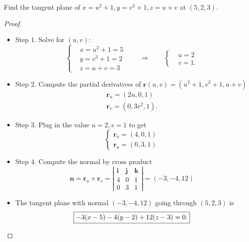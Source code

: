 \begin{example} Find the tangent plane of $x = u^2+1, y=v^3+1, z = u+v$ at $(5,2,3)$.
\end{example}
\begin{proof} \quad 
\begin{itemize}
    \item Step 1. Solve for $(u,v)$: 
    \begin{equation*}
        \begin{cases}
            & x = u^2+1 = 5\\
            & y = v^3+1 = 2\\
            & z = u + v = 3
        \end{cases} \qquad\Longrightarrow\qquad \begin{cases}
            & u = 2 \\
            & v =  1.
        \end{cases} 
    \end{equation*}
    \item Step 2. Compute the partial derivatives of $\textbf{r}(u,v) = (u^2+1, v^3+1, u+v)$
    \begin{align*}
        \textbf{r}_u = (2u, 0, 1)\\
        \textbf{r}_v = (0, 3v^2, 1).
    \end{align*}
    \item Step 3. Plug in the value $u=2,  v=1$ to get 
    \begin{equation*}
        \begin{cases}
            \textbf{r}_u = (4, 0, 1)\\
            \textbf{r}_u = (0, 3, 1)
        \end{cases} 
    \end{equation*}
    \item Step 4. Compute the normal by cross product
    \begin{equation*}
        \textbf{n} = \textbf{r}_u \times \textbf{r}_v = 
        \left|
    \begin{array}{ccc}
         \textbf{i}& \textbf{j} & \textbf{k}  \\
         4 &  0 & 1\\
         0 &  3 & 1
    \end{array}
    \right| = (-3, -4, 12)
    \end{equation*}
    \item The tangent plane with normal $(-3,-4,12)$ going through $(5,2,3)$ is
    \begin{equation*}
        \fbox{$\displaystyle 
        -3(x-5) - 4(y-2) +12(z-3) = 0.
        $}
    \end{equation*}
\end{itemize}
\end{proof}